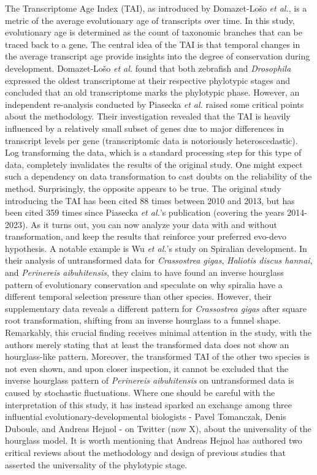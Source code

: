 The Transcriptome Age Index (TAI), as introduced by Domazet-Lošo \textit{et al.}, is a metric of the average evolutionary age of transcripts over time\cite{DomazetLoso2010}. In this study, evolutionary age is determined as the count of taxonomic branches that can be traced back to a gene. The central idea of the TAI is that temporal changes in the average transcript age provide insights into the degree of conservation during development. Domazet-Lošo \textit{et al.} found that both zebrafish and \textit{Drosophila} expressed the oldest transcriptome at their respective phylotypic stages and concluded that an old transcriptome marks the phylotypic phase. However, an independent re-analysis conducted by Piasecka \textit{et al.} raised some critical points about the methodology\cite{Piasecka2013}. Their investigation revealed that the TAI is heavily influenced by a relatively small subset of genes due to major differences in transcript levels per gene (transcriptomic data is notoriously heteroscedastic\cite{Rocke2001}). Log transforming the data, which is a standard processing step for this type of data, completely invalidates the results of the original study. One might expect such a dependency on data transformation to cast doubts on the reliability of the method. Surprisingly, the opposite appears to be true. The original study introducing the TAI has been cited 88 times between 2010 and 2013, but has been cited 359 times since Piasecka \textit{et al.}'s publication (covering the years 2014-2023). As it turns out, you can now analyze your data with and without transformation, and keep the results that reinforce your preferred evo-devo hypothesis. A notable example is Wu \textit{et al.}'s study on Spiralian development\cite{Wu2019}. In their analysis of untransformed data for \textit{Crassostrea gigas}, \textit{Haliotis discus hannai}, and \textit{Perinereis aibuhitensis}, they claim to have found an inverse hourglass pattern of evolutionary conservation and speculate on why spiralia have a different temporal selection pressure than other species. However, their supplementary data reveals a different pattern for \textit{Crassostrea gigas} after square root transformation, shifting from an inverse hourglass to a funnel shape. Remarkably, this crucial finding receives minimal attention in the study, with the authors merely stating that at least the transformed data does not show an hourglass-like pattern. Moreover, the transformed TAI of the other two species is not even shown, and upon closer inspection, it cannot be excluded that the inverse hourglass pattern of \textit{Perinereis aibuhitensis} on untransformed data is caused by stochastic fluctuations. Where one should be careful with the interpretation of this study, it has instead sparked an exchange among three influential evolutionary-developmental biologists - Pavel Tomanczak, Denis Duboule, and Andreas Hejnol - on Twitter (now X), about the universality of the hourglass model\cite{hejnoltwitter}. It is worth mentioning that Andreas Hejnol has authored two critical reviews about the methodology and design of previous studies that asserted the universality of the phylotypic stage\cite{Dunn2018,hejnol2016}.

